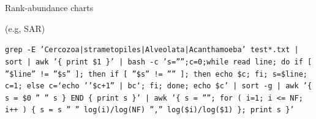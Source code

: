 \documentclass[a4paper]{article}
\begin{document}
Rank-abundance charts

(e.g, SAR)

\texttt{\small{grep -E 'Cercozoa|strametopiles|Alveolata|Acanthamoeba' test*.txt | sort | awk '\{ print \$1 \}' |  bash -c 's='''';c=0;while read line; do if [ ''\$line'' != ''\$s'' ]; then if [ ''\$s'' != '''' ]; then echo \$c; fi; s=\$line; c=1; else c=`echo ''\$c+1'' | bc`; fi; done; echo \$c' | sort -g | awk '\{ s = \$0 '' '' s \} END \{ print s \}' | awk '\{ s = ''''; for ( i=1; i <= NF; i++ ) \{ s = s '' '' log(i)/log(NF) '','' log(\$i)/log(\$1) \}; print s \}' }}

 




\end{document}
